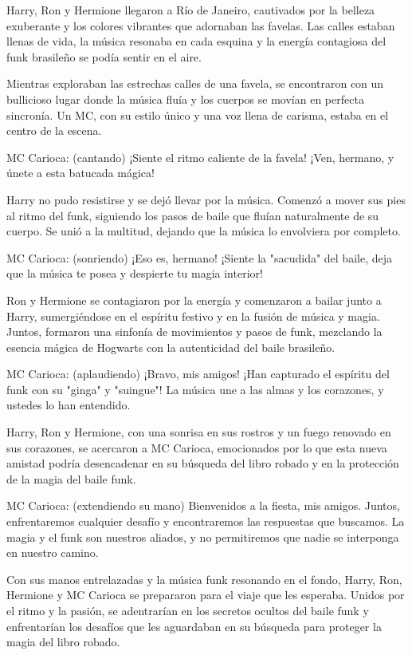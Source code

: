 Harry, Ron y Hermione llegaron a Río de Janeiro, cautivados por la belleza exuberante y los colores vibrantes que adornaban las favelas. Las calles estaban llenas de vida, la música resonaba en cada esquina y la energía contagiosa del funk brasileño se podía sentir en el aire.

Mientras exploraban las estrechas calles de una favela, se encontraron con un bullicioso lugar donde la música fluía y los cuerpos se movían en perfecta sincronía. Un MC, con su estilo único y una voz llena de carisma, estaba en el centro de la escena.

MC Carioca: (cantando) ¡Siente el ritmo caliente de la favela! ¡Ven, hermano, y únete a esta batucada mágica!

Harry no pudo resistirse y se dejó llevar por la música. Comenzó a mover sus pies al ritmo del funk, siguiendo los pasos de baile que fluían naturalmente de su cuerpo. Se unió a la multitud, dejando que la música lo envolviera por completo.

MC Carioca: (sonriendo) ¡Eso es, hermano! ¡Siente la "sacudida" del baile, deja que la música te posea y despierte tu magia interior!

Ron y Hermione se contagiaron por la energía y comenzaron a bailar junto a Harry, sumergiéndose en el espíritu festivo y en la fusión de música y magia. Juntos, formaron una sinfonía de movimientos y pasos de funk, mezclando la esencia mágica de Hogwarts con la autenticidad del baile brasileño.

MC Carioca: (aplaudiendo) ¡Bravo, mis amigos! ¡Han capturado el espíritu del funk con su "ginga" y "suingue"! La música une a las almas y los corazones, y ustedes lo han entendido.

Harry, Ron y Hermione, con una sonrisa en sus rostros y un fuego renovado en sus corazones, se acercaron a MC Carioca, emocionados por lo que esta nueva amistad podría desencadenar en su búsqueda del libro robado y en la protección de la magia del baile funk.

MC Carioca: (extendiendo su mano) Bienvenidos a la fiesta, mis amigos. Juntos, enfrentaremos cualquier desafío y encontraremos las respuestas que buscamos. La magia y el funk son nuestros aliados, y no permitiremos que nadie se interponga en nuestro camino.

Con sus manos entrelazadas y la música funk resonando en el fondo, Harry, Ron, Hermione y MC Carioca se prepararon para el viaje que les esperaba. Unidos por el ritmo y la pasión, se adentrarían en los secretos ocultos del baile funk y enfrentarían los desafíos que les aguardaban en su búsqueda para proteger la magia del libro robado.
